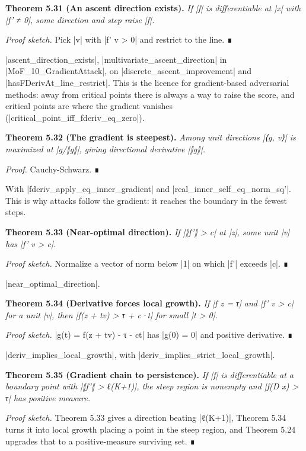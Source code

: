\documentclass{memoir}
\begin{document}
\textbf{Theorem 5.31 (An ascent direction exists).} \emph{If \LeanVerb|f| is differentiable at \LeanVerb|x| with
\LeanVerb|f' ≠ 0|, some direction and step raise \LeanVerb|f|.}

\emph{Proof sketch.} Pick \LeanVerb|v| with \LeanVerb|f' v > 0| and restrict to the line. ∎

\LeanVerb|ascent_direction_exists|, \LeanVerb|multivariate_ascent_direction| in
\LeanVerb|MoF_10_GradientAttack|, on \LeanVerb|discrete_ascent_improvement| and
\LeanVerb|hasFDerivAt_line_restrict|. This is the licence for gradient-based adversarial
methods: away from critical points there is always a way to raise the score, and
critical points are where the gradient vanishes
(\LeanVerb|critical_point_iff_fderiv_eq_zero|).

\textbf{Theorem 5.32 (The gradient is steepest).} \emph{Among unit directions \LeanVerb|⟨g, v⟩| is maximized
at \LeanVerb|g/‖g‖|, giving directional derivative \LeanVerb|‖g‖|.}

\emph{Proof.} Cauchy-Schwarz. ∎

With \LeanVerb|fderiv_apply_eq_inner_gradient| and \LeanVerb|real_inner_self_eq_norm_sq'|. This is
why attacks follow the gradient: it reaches the boundary in the fewest steps.

\textbf{Theorem 5.33 (Near-optimal direction).} \emph{If \LeanVerb|‖f'‖ > c| at \LeanVerb|z|, some unit \LeanVerb|v| has
\LeanVerb|f' v > c|.}

\emph{Proof sketch.} Normalize a vector of norm below \LeanVerb|1| on which \LeanVerb|f'| exceeds \LeanVerb|c|. ∎

\LeanVerb|near_optimal_direction|.

\textbf{Theorem 5.34 (Derivative forces local growth).} \emph{If \LeanVerb|f z = τ| and \LeanVerb|f' v > c| for a unit
\LeanVerb|v|, then \LeanVerb|f(z + tv) > τ + c·t| for small \LeanVerb|t > 0|.}

\emph{Proof sketch.} \LeanVerb|g(t) = f(z + tv) - τ - ct| has \LeanVerb|g(0) = 0| and positive derivative. ∎

\LeanVerb|deriv_implies_local_growth|, with \LeanVerb|deriv_implies_strict_local_growth|.

\textbf{Theorem 5.35 (Gradient chain to persistence).} \emph{If \LeanVerb|f| is differentiable at a boundary
point with \LeanVerb|‖f'‖ > ℓ(K+1)|, the steep region is nonempty and \LeanVerb|f(D x) > τ| has
positive measure.}

\emph{Proof sketch.} Theorem 5.33 gives a direction beating \LeanVerb|ℓ(K+1)|, Theorem 5.34 turns it
into local growth placing a point in the steep region, and Theorem 5.24 upgrades
that to a positive-measure surviving set. ∎
\end{document}
